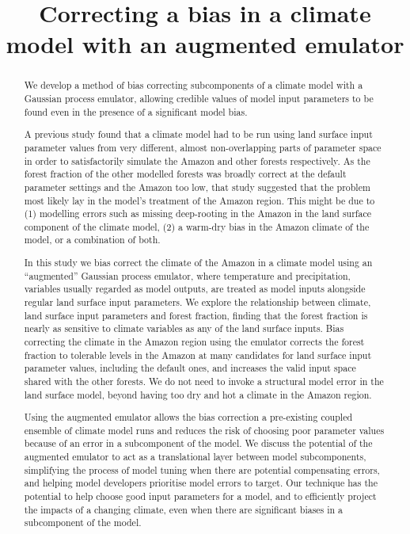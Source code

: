 \documentclass[gmdd, manuscript]{copernicus} %
\title{Correcting a bias in a climate model with an augmented emulator}
\affil[1]{Met Office Hadley Centre, FitzRoy Road, Exeter, EX1 3PB, UK}
\affil[2]{NIWA, 301 Evans Bay Parade, Hataitai, Wellington 6021, New Zealand}
\affil[3]{University of Exeter, North Park Road, Exeter, EX4 4QE, UK}
\begin{document}
\begin{abstract}
We develop a method of bias correcting subcomponents of a climate model with a Gaussian process emulator, allowing credible values of model input parameters to be found even in the presence of a significant model bias. 

A previous study \citep{mcneall2016impact} found that a climate model had to be run using land surface input parameter values from very different, almost non-overlapping parts of parameter space in order to satisfactorily simulate the Amazon and other forests respectively. As the forest fraction of the other modelled forests was broadly correct at the default parameter settings and the Amazon too low, that study suggested that the problem most likely lay in the model's treatment of the Amazon region. This might be due to (1) modelling errors such as missing deep-rooting in the Amazon in the land surface component of the climate model, (2) a warm-dry bias in the Amazon climate of the model, or a combination of both.

In this study we bias correct the climate of the Amazon in a climate model using an ``augmented'' Gaussian process emulator, where temperature and precipitation, variables usually regarded as model outputs, are treated as model inputs alongside regular land surface input parameters. We explore the relationship between climate, land surface input parameters and forest fraction, finding that the forest fraction is nearly as sensitive to climate variables as any of the land surface inputs. Bias correcting the climate in the Amazon region using the emulator corrects the forest fraction to tolerable levels in the Amazon at many candidates for land surface input parameter values, including the default ones, and increases the valid input space shared with the other forests. We do not need to invoke a structural model error in the land surface model, beyond having too dry and hot a climate in the Amazon region.

Using the augmented emulator allows the bias correction a pre-existing coupled ensemble of climate model runs and reduces the risk of choosing poor parameter values because of an error in a subcomponent of the model. We discuss the potential of the augmented emulator to act as a translational layer between model subcomponents, simplifying the process of model tuning when there are potential compensating errors, and helping model developers prioritise model errors to target. Our technique has the potential to help choose good input parameters for a model, and to efficiently project the impacts of a changing climate, even when there are significant biases in a subcomponent of the model.

\end{abstract}


\end{document}
